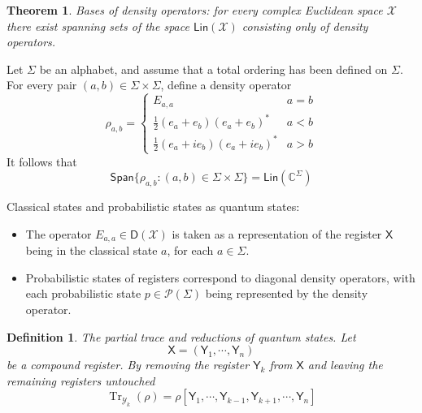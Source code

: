 \documentclass[aps,pra,onecolumn,notitlepage,superscriptaddress]{revtex4-1}
\newcommand{\C}{\mathbb{C}}
\newcommand{\reg}[1]{\mathsf{#1}}
\newcommand{\spc}[1]{\mathcal{#1}}
\newcommand{\Span}{{\mathsf{Span}}}
\newcommand{\Lin}{\mathsf{Lin}}
\newcommand{\D}{\mathsf{D}}
\newcommand{\Tr}{\operatorname{Tr}}
\newtheorem{theo}{Theorem}
\newtheorem{defi}{Definition}
\begin{document}
    \begin{theo}
        Bases of density operators: for every complex Euclidean space $\spc X$ there exist spanning sets of the space $\Lin(\spc X)$ consisting only of density operators. 
    \end{theo}
    Let $\Sigma$ be an alphabet, and assume that a total ordering has been defined on $\Sigma$. For every pair $(a,b) \in \Sigma \times \Sigma$, define a density operator
    \begin{equation}
        \rho_{a,b} = \begin{cases}
            E_{a,a} & a = b \\
            \frac{1}{2} (e_a + e_b)(e_a + e_b)^* & a < b \\
            \frac{1}{2} (e_a + ie_b)(e_a + ie_b)^* & a > b
        \end{cases}
    \end{equation}
    It follows that
    \begin{equation}
        \Span\{ \rho_{a,b} : (a,b) \in \Sigma \times \Sigma \} = \Lin(\C^\Sigma)
    \end{equation}

    Classical states and probabilistic states as quantum states:
    \begin{itemize}
        \item The operator $E_{a,a} \in \D(\spc X)$ is taken as a representation of the register $\reg X$ being in the classical state $a$, for each $a \in \Sigma$.
        \item Probabilistic states of registers correspond to diagonal density operators, with each probabilistic state $p \in \spc P(\Sigma)$ being represented by the density operator.
    \end{itemize}

    \begin{defi}
        The partial trace and reductions of quantum states. Let
        \begin{equation}
            \reg X = (\reg Y_1, \cdots, \reg Y_n)
        \end{equation}
        be a compound register. By removing the register $\reg Y_k$ from $\reg X$ and leaving the remaining registers untouched
        \begin{equation}
            \Tr_{\spc Y_k} (\rho) = \rho[\reg Y_1, \cdots, \reg Y_{k-1}, \reg Y_{k+1}, \cdots, \reg Y_n]
        \end{equation}
    \end{defi}
\end{document}
